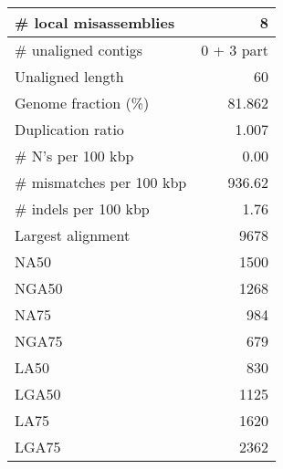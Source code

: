 \documentclass[12pt,a4paper]{article}
\begin{document}
\begin{table}[ht]
\begin{center}
\begin{tabular}{|l*{1}{|r}|}
\# local misassemblies & 8 \\ \hline
\# unaligned contigs & 0 + 3 part \\ \hline
Unaligned length & 60 \\ \hline
Genome fraction (\%) & 81.862 \\ \hline
Duplication ratio & 1.007 \\ \hline
\# N's per 100 kbp & 0.00 \\ \hline
\# mismatches per 100 kbp & 936.62 \\ \hline
\# indels per 100 kbp & 1.76 \\ \hline
Largest alignment & 9678 \\ \hline
NA50 & 1500 \\ \hline
NGA50 & 1268 \\ \hline
NA75 & 984 \\ \hline
NGA75 & 679 \\ \hline
LA50 & 830 \\ \hline
LGA50 & 1125 \\ \hline
LA75 & 1620 \\ \hline
LGA75 & 2362 \\ \hline
\end{tabular}
\end{center}
\end{table}
\end{document}
